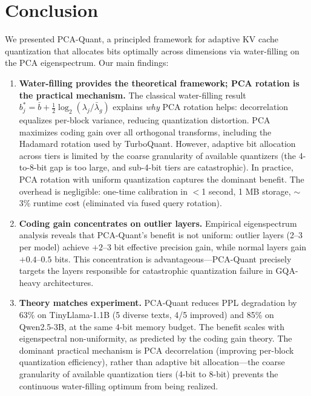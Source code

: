 \section{Conclusion}
\label{sec:conclusion}

We presented PCA-Quant, a principled framework for adaptive KV cache quantization that allocates bits optimally across dimensions via water-filling on the PCA eigenspectrum. Our main findings:

\begin{enumerate}
    \item \textbf{Water-filling provides the theoretical framework; PCA rotation is the practical mechanism.} The classical water-filling result $b_j^* = \bar{b} + \frac{1}{2}\log_2(\lambda_j / \bar{\lambda}_g)$ explains \emph{why} PCA rotation helps: decorrelation equalizes per-block variance, reducing quantization distortion. PCA maximizes coding gain over all orthogonal transforms, including the Hadamard rotation used by TurboQuant. However, adaptive bit allocation across tiers is limited by the coarse granularity of available quantizers (the 4-to-8-bit gap is too large, and sub-4-bit tiers are catastrophic). In practice, PCA rotation with uniform quantization captures the dominant benefit. The overhead is negligible: one-time calibration in $<$1 second, 1 MB storage, $\sim$3\% runtime cost (eliminated via fused query rotation).

    \item \textbf{Coding gain concentrates on outlier layers.} Empirical eigenspectrum analysis reveals that PCA-Quant's benefit is not uniform: outlier layers (2--3 per model) achieve $+2$--$3$ bit effective precision gain, while normal layers gain $+0.4$--$0.5$ bits. This concentration is advantageous---PCA-Quant precisely targets the layers responsible for catastrophic quantization failure in GQA-heavy architectures.

    \item \textbf{Theory matches experiment.} PCA-Quant reduces PPL degradation by 63\% on TinyLlama-1.1B (5 diverse texts, 4/5 improved) and 85\% on Qwen2.5-3B, at the same 4-bit memory budget. The benefit scales with eigenspectral non-uniformity, as predicted by the coding gain theory. The dominant practical mechanism is PCA decorrelation (improving per-block quantization efficiency), rather than adaptive bit allocation---the coarse granularity of available quantization tiers (4-bit to 8-bit) prevents the continuous water-filling optimum from being realized.


\end{enumerate}
